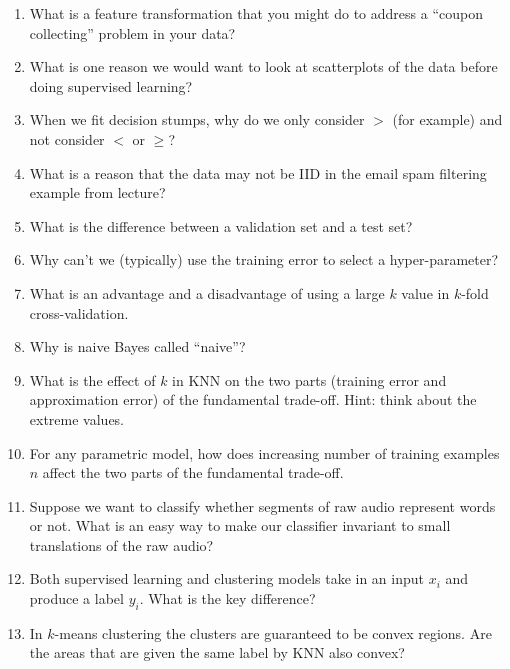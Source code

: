 \documentclass{article}
\def\enum#1{\begin{enumerate}#1\end{enumerate}}
\begin{document}
\enum{
 \item What is a feature transformation that you might do to address a ``coupon collecting'' problem in your data?
\item What is one reason we would want to look at scatterplots of the data before doing supervised learning?
 \item When we fit decision stumps, why do we only consider $>$ (for example) and not consider $<$ or $\geq$?
\item What is a reason that the data may not be IID in the email spam filtering example from lecture?
\item What is the difference between a validation set and a test set?
\item Why can't we (typically) use the training error to select a hyper-parameter?
\item What is an advantage and a disadvantage of using a large $k$ value in $k$-fold cross-validation.
\item Why is  naive Bayes called ``naive''?
\item What is the effect of $k$ in KNN on the two parts (training error and approximation error) of the fundamental trade-off. Hint: think about the extreme values.
\item For any parametric model, how does increasing number of training examples $n$ affect the two parts of the fundamental trade-off.
\item Suppose we want to classify whether segments of raw audio represent words or not. What is an easy way to make our classifier invariant to small translations of the raw audio?
\item Both supervised learning and clustering models take in an input $x_i$ and produce a label $y_i$. What is the key difference?
\item In $k$-means clustering the clusters are guaranteed to be convex regions. Are the areas that are given the same label by KNN also convex?
}
\end{document}

